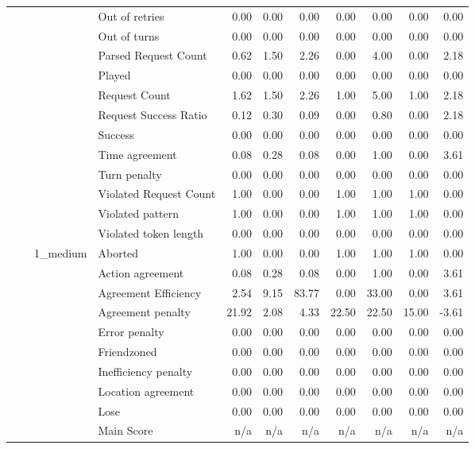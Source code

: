 \begin{tabular}{llllrrrrrrr}
 &  &  & Out of retries & 0.00 & 0.00 & 0.00 & 0.00 & 0.00 & 0.00 & 0.00 \\
 &  &  & Out of turns & 0.00 & 0.00 & 0.00 & 0.00 & 0.00 & 0.00 & 0.00 \\
 &  &  & Parsed Request Count & 0.62 & 1.50 & 2.26 & 0.00 & 4.00 & 0.00 & 2.18 \\
 &  &  & Played & 0.00 & 0.00 & 0.00 & 0.00 & 0.00 & 0.00 & 0.00 \\
 &  &  & Request Count & 1.62 & 1.50 & 2.26 & 1.00 & 5.00 & 1.00 & 2.18 \\
 &  &  & Request Success Ratio & 0.12 & 0.30 & 0.09 & 0.00 & 0.80 & 0.00 & 2.18 \\
 &  &  & Success & 0.00 & 0.00 & 0.00 & 0.00 & 0.00 & 0.00 & 0.00 \\
 &  &  & Time agreement & 0.08 & 0.28 & 0.08 & 0.00 & 1.00 & 0.00 & 3.61 \\
 &  &  & Turn penalty & 0.00 & 0.00 & 0.00 & 0.00 & 0.00 & 0.00 & 0.00 \\
 &  &  & Violated Request Count & 1.00 & 0.00 & 0.00 & 1.00 & 1.00 & 1.00 & 0.00 \\
 &  &  & Violated pattern & 1.00 & 0.00 & 0.00 & 1.00 & 1.00 & 1.00 & 0.00 \\
 &  &  & Violated token length & 0.00 & 0.00 & 0.00 & 0.00 & 0.00 & 0.00 & 0.00 \\
\cline{3-11}
 &  & \multirow[t]{27}{*}{1_medium} & Aborted & 1.00 & 0.00 & 0.00 & 1.00 & 1.00 & 1.00 & 0.00 \\
 &  &  & Action agreement & 0.08 & 0.28 & 0.08 & 0.00 & 1.00 & 0.00 & 3.61 \\
 &  &  & Agreement Efficiency & 2.54 & 9.15 & 83.77 & 0.00 & 33.00 & 0.00 & 3.61 \\
 &  &  & Agreement penalty & 21.92 & 2.08 & 4.33 & 22.50 & 22.50 & 15.00 & -3.61 \\
 &  &  & Error penalty & 0.00 & 0.00 & 0.00 & 0.00 & 0.00 & 0.00 & 0.00 \\
 &  &  & Friendzoned & 0.00 & 0.00 & 0.00 & 0.00 & 0.00 & 0.00 & 0.00 \\
 &  &  & Inefficiency penalty & 0.00 & 0.00 & 0.00 & 0.00 & 0.00 & 0.00 & 0.00 \\
 &  &  & Location agreement & 0.00 & 0.00 & 0.00 & 0.00 & 0.00 & 0.00 & 0.00 \\
 &  &  & Lose & 0.00 & 0.00 & 0.00 & 0.00 & 0.00 & 0.00 & 0.00 \\
 &  &  & Main Score & n/a & n/a & n/a & n/a & n/a & n/a & n/a \\

\end{tabular}
